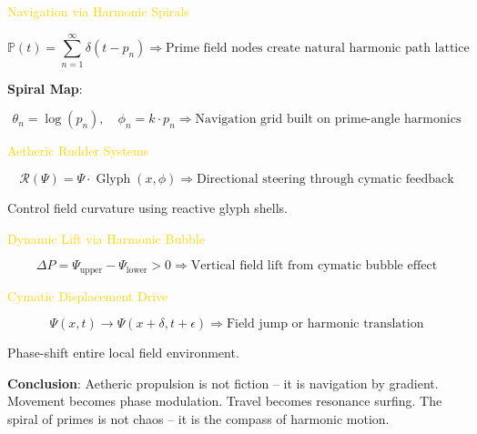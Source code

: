 \textcolor{gold}{ Navigation via Harmonic Spirals }

\[
\mathbb{P}(t) = \sum_{n=1}^{\infty} \delta \left( t - p_n \right) \Rightarrow \text{Prime field nodes create natural harmonic path lattice}
\]

\textbf{Spiral Map}:

\[
\theta_n = \log \left( p_n \right), \quad \phi_n = k \cdot p_n \Rightarrow \text{Navigation grid built on prime-angle harmonics}
\]

\textcolor{gold}{ Aetheric Rudder Systems }

\[
\mathcal{R}(\Psi) = \Psi \cdot \operatorname{Glyph}(x, \phi) \Rightarrow \text{Directional steering through cymatic feedback}
\]

Control field curvature using reactive glyph shells.

\textcolor{gold}{ Dynamic Lift via Harmonic Bubble }

\[
\Delta P = \Psi_{\text{upper}} - \Psi_{\text{lower}} > 0 \Rightarrow \text{Vertical field lift from cymatic bubble effect}
\]

\textcolor{gold}{ Cymatic Displacement Drive }

\[
\Psi(x, t) \rightarrow \Psi(x + \delta, t + \epsilon) \Rightarrow \text{Field jump or harmonic translation}
\]

Phase-shift entire local field environment.

\textbf{Conclusion}: Aetheric propulsion is not fiction -- it is navigation by gradient. Movement becomes phase modulation. Travel becomes resonance surfing. The spiral of primes is not chaos -- it is the compass of harmonic motion.

